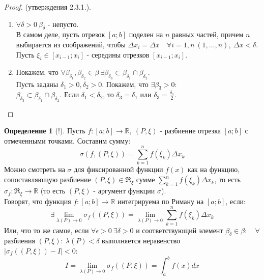 \documentclass{report}
\theoremstyle{definition}
\newtheorem{definition}{Определение}[section]
\begin{document}
\begin{proof}
  (утверждения 2.3.1.).
  \begin{enumerate}
    \item $\forall\delta>0 \ \beta_{\delta}$ - непусто.\\

          В самом деле, пусть отрезок $[a;b]$ поделен на $n$ равных частей, причем $n$ выбирается из соображений,
          чтобы $\Delta x_{i} = \Delta x \quad \forall i = \overline{1,n} \ (1,\ldots,n), \ \Delta x < \delta$.\\

          Пусть $\xi_{i} \in [x_{i-1};x_{i}]$ - середины отрезков $[x_{i-1};x_{i}]$.

    \item Покажем, что $\forall \beta_{\delta_{1}},\beta_{\delta_{2}} \in \beta \ \exists \beta_{\delta_{3}}
            \subset \beta_{\delta_{1}} \cap \beta_{\delta_{2}}$.\\

          Пусть заданы $\delta_{1}>0, \delta_{2}>0$. Покажем, что $\exists\beta_{3}>0$:\\
          $\beta_{\delta_{3}} \subset \beta_{\delta_{1}} \cap \beta_{\delta_{2}}$. Если $\delta_{1} < \delta_{2}$,
          то $\delta_{3} = \delta_{1}$ или $\delta_{3} = \frac{\delta_{1}}{2}$.
  \end{enumerate}
\end{proof}

\begin{definition}[!]
  Пусть $f:[a;b]\rightarrow\mathbb{R}, \ (P,\xi)$ - разбиение отрезка $[a;b]$ с отмеченными точками. Составим сумму:
  \begin{equation*}
    \sigma(f,(P,\xi)) = \sum_{k=1}^{n}f(\xi_{k})\Delta x_{k}
  \end{equation*}
  Можно смотреть на $\sigma$ для фиксированной функции $f(x)$ как на функцию, сопоставляющую разбиение $(P,\xi)\in
    \Re_{\xi}$ сумме $\sum_{k=1}^{n}f(\xi_{k})\Delta x_{k}$, то есть $\sigma_{f}:\Re_{\xi}\rightarrow\mathbb{R}$
  (то есть $(P,\xi)$ - аргумент функции $\sigma$).\\

  Говорят, что функция $f:[a;b]\rightarrow\mathbb{R}$ интегрируема по Риману на $[a;b]$, если:
  \begin{equation*}
    \exists\underset{\lambda(P)\rightarrow0}{\lim}\sigma_{f}((P,\xi)) = \underset{\lambda(P)\rightarrow0}{\lim}
    \sum_{k=1}^{n}f(\xi_{k})\Delta x_{k}
  \end{equation*}
  Или, что то же самое, если $\forall\epsilon>0 \ \exists\delta>0$ и соответствующий элемент $\beta_{\delta} \in
    \beta:\quad \forall$ разбиения $(P,\xi): \ \lambda(P) < \delta$ выполняется неравенство \\ $| \sigma_{f}
    ((P,\xi)) - I | < 0$:
  \begin{equation*}
    I = \underset{\lambda(P)\rightarrow0}{\lim}\sigma_{f}((P,\xi)) = \int_{a}^{b}f(x)dx
  \end{equation*}
\end{definition}
\end{document}
